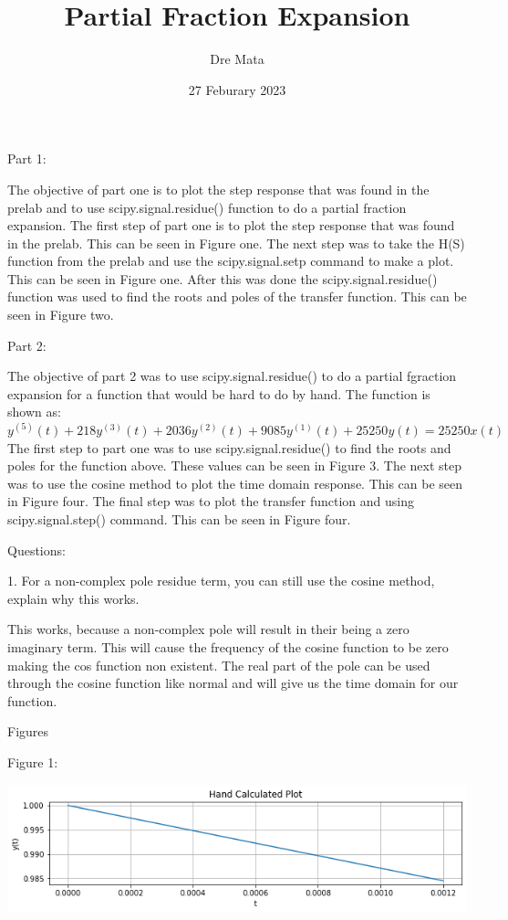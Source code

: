 \documentclass[nobib]{MSword}
\title{Partial Fraction Expansion}
\author{Dre Mata}
\date{27 Feburary 2023}
\begin{document}
\maketitle
\begin{center}
    Part 1:
\end{center}
 The objective of part one is to plot the step response that was found in the prelab and to use scipy.signal.residue() function to do a partial fraction expansion. The first step of part one is to plot the step response that was found in the prelab. This can be seen in Figure one. The next step was to take the H(S) function from the prelab and use the scipy.signal.setp command to make a plot. This can be seen in Figure one. After this was done the scipy.signal.residue() function was used to find the roots and poles of the transfer function. This can be seen in Figure two.


\begin{center}
    Part 2:
\end{center}
The objective of part 2 was to use scipy.signal.residue() to do a partial fgraction expansion for a function that would be hard to do by hand. The function is shown as: 
$y^(5)(t) + 218y^(3)(t) + 2036y^(2)(t) + 9085y^(1)(t) + 25250y(t) = 25250x(t)$
The first step to part one was to use scipy.signal.residue() to find the roots and poles for the function above. These values can be seen in Figure 3. The next step was to use the cosine method to plot the time domain response. This can be seen in Figure four. The final step was to plot the transfer function and using scipy.signal.step() command. This can be seen in Figure four.

\begin{center}
    Questions:
\end{center}
1. For a non-complex pole residue term, you can still use the cosine method, explain why this works.

This works, because a non-complex pole will result in their being a zero imaginary term. This will cause the frequency of the cosine function to be zero making the cos function non existent. The real part of the pole can be used through the cosine function like normal and will give us the time domain for our function. 
\begin{center}
    Figures
\end{center}

Figure 1:

\includegraphics[scale = 0.50]
{txt/Lab6Fig1.png}
\end{document}
